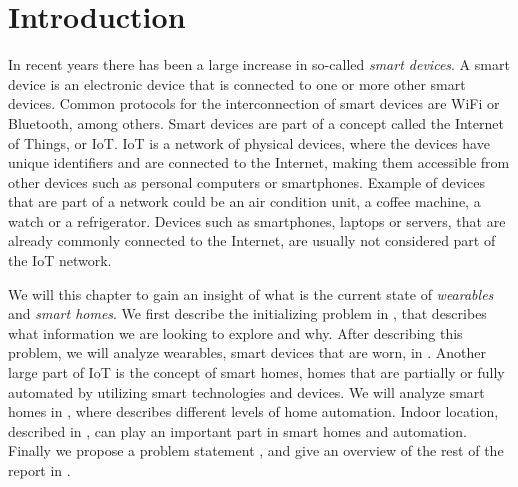 \chapter{Introduction}\label{chap:introduction}
In recent years there has been a large increase in so-called \emph{smart devices}. 
A smart device is an electronic device that is connected to one or more other smart devices. 
Common protocols for the interconnection of smart devices are WiFi or Bluetooth, among others.
Smart devices are part of a concept called the Internet of Things, or IoT. 
IoT is a network of physical devices, 
where the devices have unique identifiers and are connected to the Internet, 
making them accessible from other devices such as personal computers or smartphones. 
Example of devices that are part of a network could be an air condition unit, a coffee machine, a watch or a refrigerator. 
Devices such as smartphones, laptops or servers, that are already commonly connected to the Internet, are usually not considered part of the IoT network. 

We will this chapter to gain an insight of what is the current state of \emph{wearables} and \emph{smart homes}. 
We first describe the initializing problem in , 
that describes what information we are looking to explore and why. 
After describing this problem, we will analyze wearables, \ie smart devices that are worn, in .
Another large part of IoT is the concept of smart homes, 
\ie homes that are partially or fully automated by utilizing smart technologies and devices. 
We will analyze smart homes in , 
where  describes different levels of home automation. 
Indoor location, described in , 
can play an important part in smart homes and automation.
Finally we propose a problem statement , 
and give an overview of the rest of the report in .









